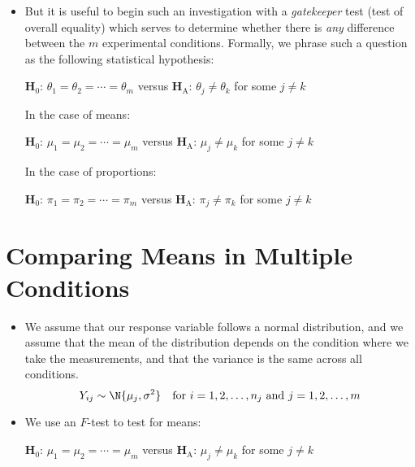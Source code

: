 \begin{itemize}
      \item But it is useful to begin such an investigation with a \emph{gatekeeper}
            test (test of overall equality) which serves to determine whether
            there is \emph{any} difference between the $ m $ experimental conditions.
            Formally, we phrase such a question as the following statistical hypothesis:
            \begin{tightcenter}
                  $ \mathbf{H}_0 $: $ \theta_1=\theta_2=\cdots=\theta_m $ versus $ \mathbf{H}_\text{A} $: $ \theta_j\ne \theta_k $ for some $ j\ne k $
            \end{tightcenter}
            In the case of means:
            \begin{tightcenter}
                  $ \mathbf{H}_0 $: $ \mu_1=\mu_2=\cdots=\mu_m $ versus $ \mathbf{H}_\text{A} $: $ \mu_j\ne \mu_k $ for some $ j\ne k $
            \end{tightcenter}
            In the case of proportions:
            \begin{tightcenter}
                  $ \mathbf{H}_0 $: $ \pi_1=\pi_2=\cdots=\pi_m $ versus $ \mathbf{H}_\text{A} $: $ \pi_j\ne \pi_k $ for some $ j\ne k $
            \end{tightcenter}
\end{itemize}
\section{Comparing Means in Multiple Conditions}
\begin{itemize}
      \item We assume that our response variable follows a normal distribution,
            and we assume that the mean of the distribution depends on the condition
            where we take the measurements, and that the variance
            is the same across all conditions.
            \[ Y_{ij}\sim \N{\mu_j,\sigma^2}\quad\text{for }i=1,2,\ldots,n_j\text{ and }j=1,2,\ldots,m \]
      \item We use an $ F $-test to test for means:
            \begin{tightcenter}
                  $ \mathbf{H}_0 $: $ \mu_1=\mu_2=\cdots=\mu_m $ versus $\mathbf{H}_\text{A}$: $ \mu_j\ne \mu_k $ for some $ j\ne k $
            \end{tightcenter}
\end{itemize}

